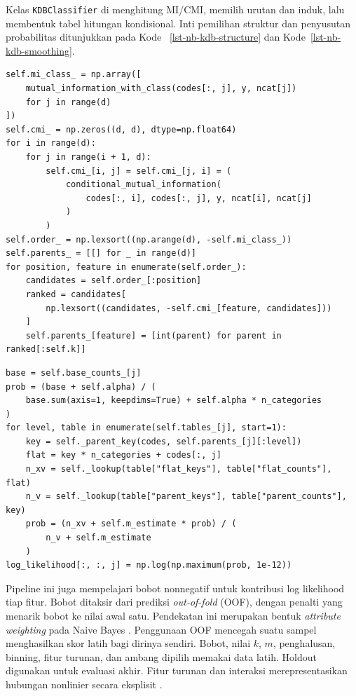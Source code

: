 Kelas \texttt{KDBClassifier} di
 menghitung MI/CMI, memilih
urutan dan induk, lalu membentuk tabel hitungan kondisional. Inti pemilihan
struktur dan penyusutan probabilitas ditunjukkan pada Kode
~\ref{lst-nb-kdb-structure} dan Kode~\ref{lst-nb-kdb-smoothing}.

\begin{lstlisting}[caption={Urutan fitur dan pemilihan induk pada KDB},label={lst-nb-kdb-structure}]
self.mi_class_ = np.array([
    mutual_information_with_class(codes[:, j], y, ncat[j])
    for j in range(d)
])
self.cmi_ = np.zeros((d, d), dtype=np.float64)
for i in range(d):
    for j in range(i + 1, d):
        self.cmi_[i, j] = self.cmi_[j, i] = (
            conditional_mutual_information(
                codes[:, i], codes[:, j], y, ncat[i], ncat[j]
            )
        )
self.order_ = np.lexsort((np.arange(d), -self.mi_class_))
self.parents_ = [[] for _ in range(d)]
for position, feature in enumerate(self.order_):
    candidates = self.order_[:position]
    ranked = candidates[
        np.lexsort((candidates, -self.cmi_[feature, candidates]))
    ]
    self.parents_[feature] = [int(parent) for parent in ranked[:self.k]]
\end{lstlisting}

\begin{lstlisting}[caption={Penyusutan likelihood kondisional KDB dengan m-estimate},label={lst-nb-kdb-smoothing}]
base = self.base_counts_[j]
prob = (base + self.alpha) / (
    base.sum(axis=1, keepdims=True) + self.alpha * n_categories
)
for level, table in enumerate(self.tables_[j], start=1):
    key = self._parent_key(codes, self.parents_[j][:level])
    flat = key * n_categories + codes[:, j]
    n_xv = self._lookup(table["flat_keys"], table["flat_counts"], flat)
    n_v = self._lookup(table["parent_keys"], table["parent_counts"], key)
    prob = (n_xv + self.m_estimate * prob) / (
        n_v + self.m_estimate
    )
log_likelihood[:, :, j] = np.log(np.maximum(prob, 1e-12))
\end{lstlisting}

Pipeline ini juga mempelajari bobot nonnegatif untuk kontribusi log
likelihood tiap fitur. Bobot ditaksir dari prediksi \textit{out-of-fold}
(OOF), dengan penalti yang menarik bobot ke nilai awal satu. Pendekatan ini
merupakan bentuk \textit{attribute weighting} pada Naive Bayes
\cite{zaidi2013alleviating}. Penggunaan OOF mencegah suatu sampel
menghasilkan skor latih bagi dirinya sendiri. Bobot, nilai $k$, $m$,
penghalusan, binning, fitur turunan, dan ambang dipilih memakai data latih.
Holdout digunakan untuk evaluasi akhir. Fitur turunan dan interaksi
merepresentasikan hubungan nonlinier secara eksplisit
\cite{james2021islr}.

